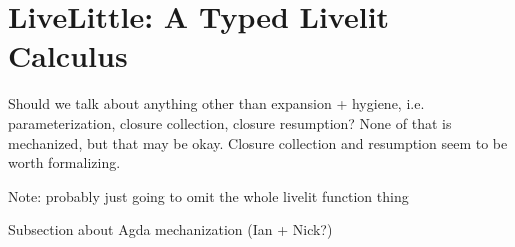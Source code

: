 \section{LiveLittle: A Typed Livelit Calculus}\label{sec:livelit-calculus}
Should we talk about anything other than expansion + hygiene, i.e. parameterization, closure collection, closure resumption?
None of that is mechanized, but that may be okay. Closure collection and resumption seem to be worth formalizing.

Note: probably just going to omit the whole livelit function thing

Subsection about Agda mechanization (Ian + Nick?)